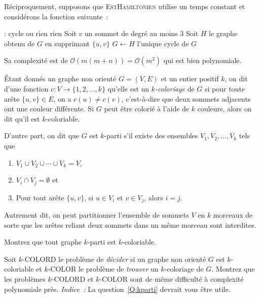 \documentclass[12pt,addpoints]{exam}
\newcommand{\bigo}{\mathcal{O}}
\begin{document}
\begin{questions}
\begin{solution}
Réciproquement, supposons que \textsc{EstHamiltonien} utilise un temps constant et considérons la fonction suivante~:
\begin{algorithmic}[1]
   : cycle ou rien
      \State \Return rien
    \Else
        \State Soit $v$ un sommet de degré au moins $3$
          \State Soit $H$ le graphe obtenu de $G$ en supprimant $\{u,v\}$
            \State $G \leftarrow H$
          \EndIf
        \EndFor
      \EndWhile
      \State \Return l'unique cycle de $G$
    \EndIf
  \EndFunction
\end{algorithmic}
Sa complexité est de $\bigo(m(m + n)) = \bigo(m^2)$ qui est bien polynomiale.
\end{solution}

\question\label{Q:kparti}
Étant donnés un graphe non orienté $G = (V,E)$ et un entier positif $k$, on dit d'une fonction $c : V \rightarrow \{1,2,\ldots,k\}$ qu'elle est un \emph{$k$-coloriage} de $G$ si pour toute arête $\{u,v\} \in E$, on a $c(u) \neq c(v)$, c'est-à-dire que deux sommets adjacents ont une couleur différente. Si $G$ peut être colorié à l'aide de $k$ couleurs, alors on dit qu'il est $k$-coloriable.

D'autre part, on dit que $G$ est $k$-parti s'il existe des ensembles $V_1, V_2, \ldots, V_k$ tels que
\begin{enumerate}
  \item $V_1 \cup V_2 \cup \cdots \cup V_k = V$,
  \item $V_i \cap V_j = \emptyset$ et
  \item Pour tout arête $\{u,v\}$, si $u \in V_i$ et $v \in V_j$, alors $i = j$.
\end{enumerate}
Autrement dit, on peut partitionner l'ensemble de sommets $V$ en $k$ morceaux de sorte que les arêtes reliant deux sommets dans un même morceau sont interdites.

Montrez que tout graphe $k$-parti est $k$-coloriable.

\question
Soit $k$-COLORD le problème de \emph{décider} si un graphe non orienté $G$ est $k$-coloriable et $k$-COLOR le problème de \emph{trouver} un $k$-coloriage de $G$. Montrez que les problèmes $k$-COLORD et $k$-COLOR sont de même difficulté à complexité polynomiale près. \emph{Indice~:} La question~\ref{Q:kparti} devrait vous être utile.


\end{questions}
\end{document}
